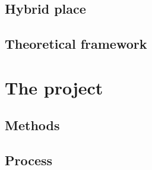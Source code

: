 \documentclass[UKenglish]{ifimaster}
\begin{document}
\chapter{Hybrid place}

\chapter{Theoretical framework}

\part{The project}
\chapter{Methods}

\chapter{Process}


\backmatter{}
\printbibliography
\end{document}
